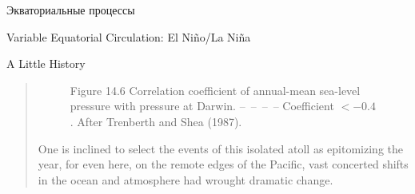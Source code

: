 \begin{chapter}{Экваториальные процессы}
\begin{section}{Variable Equatorial Circulation: El Ni\~{n}o/La Ni\~{n}a}
\begin{paragraph}{A Little History}
\begin{quotation}
\begin{figure}[b!]
\begin{center}
\end{center}
\caption{Figure 14.6 Correlation coefficient of annual-mean
sea-level pressure with pressure at Darwin. --\ --\ --\ -- Coefficient
$< -0.4$. After Trenberth and Shea (1987).}
\label{fig:ensocorrelations}
\end{figure}
%
%

One is inclined to select the events of this isolated atoll as
epitomizing the year, for even here, on the remote edges of the
Pacific, vast concerted shifts in the ocean and atmosphere had wrought
dramatic change.
%


\end{quotation}
\end{paragraph}
\end{section}
\end{chapter}
